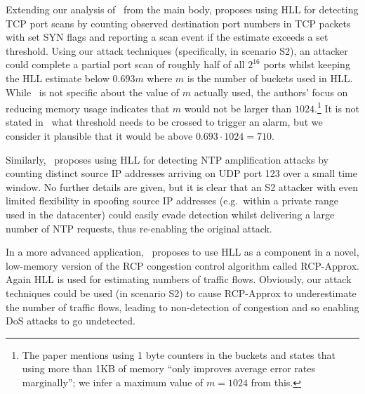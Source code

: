 \documentclass[sigconf, anonymous, dvipsnames]{acmart} %
\begin{document}
Extending our analysis of~\cite{flexswitch} from the main body, \cite[Section 4.2]{flexswitch} proposes using HLL for detecting TCP port scans by counting observed destination port numbers in TCP packets with set SYN flags and reporting a scan event if the estimate exceeds a
set threshold. Using our attack techniques (specifically, in scenario S2), an attacker could complete a partial port scan of roughly half of all $2^{16}$ ports whilst keeping the HLL estimate below $0.693m$ where $m$ is the number of buckets used in HLL. While~\cite{flexswitch} is not specific about the value of $m$ actually used, the authors' focus on reducing memory usage indicates that $m$ would not be larger than $1024$.\footnote{The paper mentions using 1 byte counters in the buckets and states that using more than 1KB of memory ``only improves average error rates marginally''; we infer a maximum value of $m=1024$ from this.} It is not stated in~\cite{flexswitch} what threshold needs to be crossed to trigger an alarm, but we consider it plausible that it would be above $0.693 \cdot 1024 = 710$. 

Similarly,~\cite[Section 4.2]{flexswitch} proposes using HLL for detecting NTP amplification attacks by counting distinct source IP addresses arriving on UDP port 123 over a small time window. No further details are given, but it is clear that an S2 attacker with even limited flexibility in spoofing source IP addresses (e.g.\ within a private range used in the datacenter) could easily evade detection whilst delivering a large number of NTP requests, thus re-enabling the original attack.

In a more advanced application,~\cite[Section 4.3]{flexswitch} proposes to use HLL as a component in a novel, low-memory version of the RCP congestion control algorithm called RCP-Approx. Again HLL is used for estimating numbers of traffic flows. Obviously, our attack techniques could be used (in scenario S2) to cause RCP-Approx to underestimate the number of traffic flows, leading to non-detection of congestion and so enabling DoS attacks to go undetected. 
\end{document}
